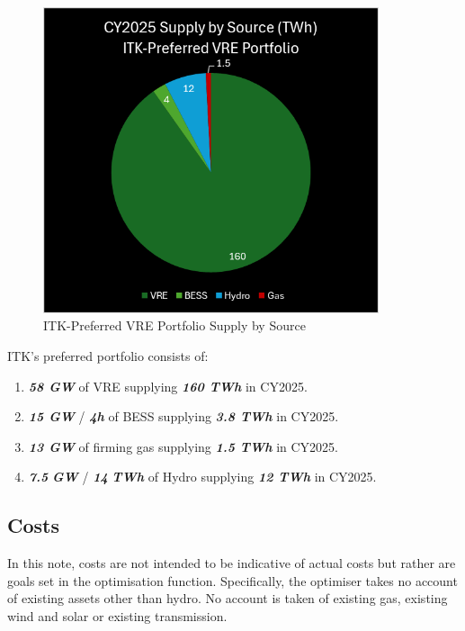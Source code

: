 \documentclass[
  letterpaper,
  DIV=11,
  numbers=noendperiod]{scrartcl}
\begin{document}
\begin{figure}[H]

{\centering \includegraphics[width=3.88056in,height=3.54028in]{./media/media/image16.png}

}

\caption{ITK-Preferred VRE Portfolio Supply by Source}

\end{figure}%

ITK's preferred portfolio consists of:

\begin{enumerate}
\def\labelenumi{\alph{enumi}.}
\item
  \textbf{\emph{58 GW}} of VRE supplying \textbf{\emph{160 TWh}} in
  CY2025.
\item
  \textbf{\emph{15 GW}} / \textbf{\emph{4h}} of BESS supplying
  \textbf{\emph{3.8 TWh}} in CY2025.
\item
  \textbf{\emph{13 GW}} of firming gas supplying \textbf{\emph{1.5 TWh}}
  in CY2025.
\item
  \textbf{\emph{7.5}} \textbf{\emph{GW}} / \textbf{\emph{14}}
  \textbf{\emph{TWh}} of Hydro supplying \textbf{\emph{12 TWh}} in
  CY2025.
\end{enumerate}

\subsection{Costs}\label{costs}

In this note, costs are not intended to be indicative of actual costs
but rather are goals set in the optimisation function. Specifically, the
optimiser takes no account of existing assets other than hydro. No
account is taken of existing gas, existing wind and solar or existing
transmission.
\end{document}

